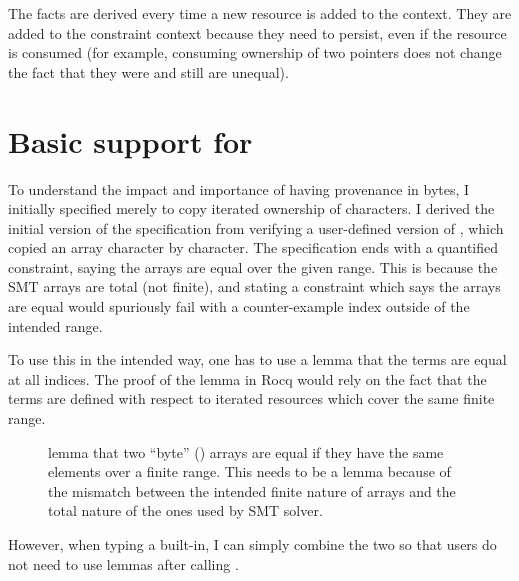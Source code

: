 
The facts are derived every time a new resource is added to the context.
They are added to the constraint context because they need to persist,
even if the resource is consumed (for example, consuming ownership
of two pointers does not change the fact that they were and still
are unequal).


\section{Basic support for }

To understand the impact and importance of having provenance in
bytes, I initially specified  merely to copy iterated
ownership of characters. I derived the initial version of the specification
from verifying a user-defined version of , which copied an
array character by character. The specification ends with a quantified constraint,
saying the arrays are equal over the given range. This is because the SMT arrays
are total (not finite), and stating a constraint which says the arrays are equal
would spuriously fail with a counter-example index outside of the intended range.


To use this in the intended way, one has to use a lemma that the terms are
equal at all indices. The proof of the lemma in Rocq would rely on the fact
that the terms are defined with respect to iterated resources which cover the
same finite range.

\begin{figure}[h]
\caption{ lemma that two ``byte'' () arrays
    are equal if they have the same elements over a finite range. This needs
    to be a lemma because of the mismatch between the intended finite nature
    of arrays and the total nature of the ones used by SMT solver.}\label{fig:byte-array-eq-lemma}
\end{figure}

However, when typing a built-in, I can simply combine the two so that users do
not need to use lemmas after calling .

